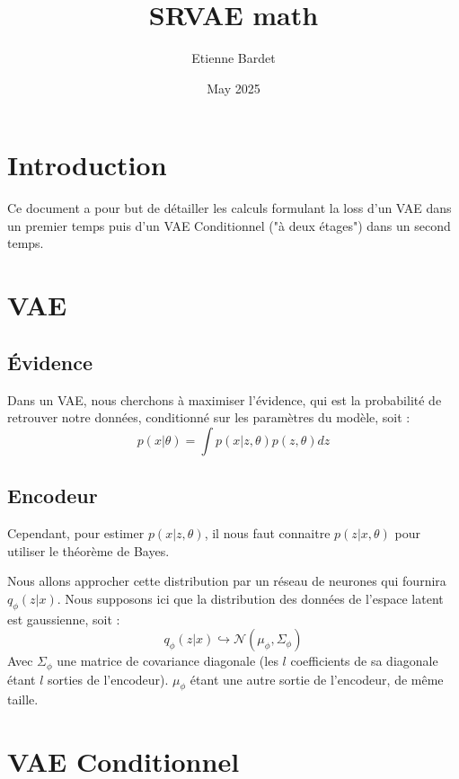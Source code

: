 \documentclass{article}
\title{SRVAE math}
\author{Etienne Bardet}
\date{May 2025}
\begin{document}
\maketitle

\section{Introduction}
Ce document a pour but de détailler les calculs formulant la loss d'un VAE dans un premier temps puis d'un VAE Conditionnel ("à deux étages") dans un second temps.

\section{VAE}
\subsection{Évidence}
Dans un VAE, nous cherchons à maximiser l'évidence, qui est la probabilité de retrouver notre données, conditionné sur les paramètres du modèle, soit :
\begin{equation*}
    p(x|\theta) = \int p(x|z,\theta) p(z,\theta)dz
\end{equation*}

\subsection{Encodeur}

Cependant, pour estimer $p(x|z,\theta)$, il nous faut connaitre $p(z|x,\theta)$ pour utiliser le théorème de Bayes.

Nous allons approcher cette distribution par un réseau de neurones qui fournira $q_{\phi}(z|x)$.
Nous supposons ici que la distribution des données de l'espace latent est gaussienne, soit :
\begin{equation*}
    q_{\phi}(z|x) \hookrightarrow \mathcal{N}(\mu_{\phi}, \Sigma_{\phi})
\end{equation*}
Avec $\Sigma_\phi$ une matrice de covariance diagonale (les $l$ coefficients de sa diagonale étant $l$ sorties de l'encodeur). $\mu_\phi$ étant une autre sortie de l'encodeur, de même taille.





\section{VAE Conditionnel}
\end{document}
